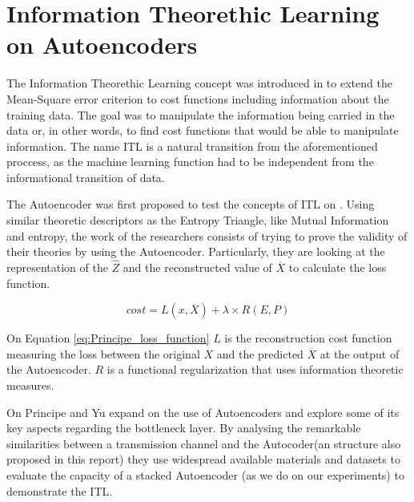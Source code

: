 \label{chap:StateArt}
\section{Information Theorethic Learning on Autoencoders}

The Information Theorethic Learning concept was introduced in \cite{Principe_2000} to extend the Mean-Square error criterion to cost functions including information about the training data. The goal was to manipulate the information being carried in the data or, in other words, to find cost functions that would be able to manipulate information. The name ITL is a natural transition from the aforementioned proccess, as the machine learning function had to be independent from the informational transition of data. \par

The Autoencoder was first proposed to test the concepts of ITL on \cite{Santana_2016}. Using similar theoretic descriptors as the Entropy Triangle, like Mutual Information and entropy, the work of the researchers consists of trying to prove the validity of their theories by using the Autoencoder. Particularly, they are looking at the representation of the $\hat{Z}$ and the reconstructed value of $\overline{X}$ to calculate the loss function.

\begin{equation}\label{eq:Principe_loss_function}
cost = L(x,\overline{X}) + \lambda \times R(E,P)
\end{equation}

On Equation \ref{eq:Principe_loss_function} $L$ is the reconstruction cost function measuring the loss between the original $X$ and the predicted $\overline{X}$ at the output of the Autoencoder. $R$ is a functional regularization that uses information theoretic measures.\par

On \cite{Yu_2019} Principe and Yu expand on the use of Autoencoders and explore some of its key aspects regarding the bottleneck layer. By analysing the remarkable similarities between a transmission channel and the Autocoder(an structure also proposed in this report) they use widespread available materials and datasets to evaluate the capacity of a stacked Autoencoder (as we do on our experiments) to demonstrate the ITL. 